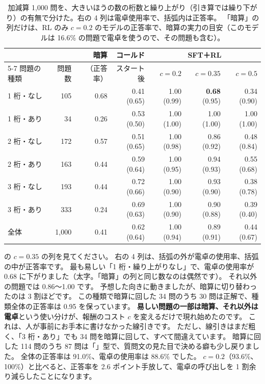 \begin{table}[tbp]
\centering
\caption{加減算 1,000 問を、大きいほうの数の桁数と繰り上がり（引き算では繰り下がり）の有無で分けた。右の 4 列は電卓使用率で、括弧内は正答率。
「暗算」の列だけは、RL のみ $c=0.2$ のモデルの正答率で、暗算の実力の目安（このモデルは 16.6\% の問題で電卓を使うので、その問題も含む）。}
\label{tab:arl-breakdown}
\small
\begin{tabular}{lrrrrrr}
\toprule
 & & 暗算 & コールド & \multicolumn{3}{c}{SFT＋RL} \\
\cmidrule(lr){5-7}
問題の種類 & 問題数 & （正答率） & スタート後 & $c=0.2$ & $c=0.35$ & $c=0.5$ \\
\midrule
1 桁・なし & 105 & 0.68 & 0.41 (0.65) & 1.00 (0.99) & \textbf{0.68} (0.95) & 0.34 (0.90) \\
1 桁・あり & 34 & 0.26 & 0.53 (0.50) & 1.00 (1.00) & 1.00 (1.00) & 1.00 (1.00) \\
2 桁・なし & 172 & 0.57 & 0.51 (0.65) & 1.00 (0.98) & 0.86 (0.92) & 0.48 (0.84) \\
2 桁・あり & 163 & 0.44 & 0.59 (0.64) & 1.00 (0.95) & 0.94 (0.93) & 0.55 (0.68) \\
3 桁・なし & 193 & 0.44 & 0.72 (0.66) & 1.00 (0.90) & 0.93 (0.90) & 0.38 (0.78) \\
3 桁・あり & 333 & 0.24 & 0.69 (0.63) & 1.00 (0.90) & 0.90 (0.88) & 0.39 (0.40) \\
\midrule
全体 & 1,000 & 0.41 & 0.62 (0.64) & 1.00 (0.94) & 0.89 (0.91) & 0.44 (0.67) \\
\bottomrule
\end{tabular}
\end{table}

の $c=0.35$ の列を見てください。
右の 4 列は、括弧の外が電卓の使用率、括弧の中が正答率です。
最も易しい「1 桁・繰り上がりなし」で、電卓の使用率が 0.68 に下がりました（太字。「暗算」の列と同じ数なのは偶然です）。
それ以外の問題では 0.86〜1.00 です。
予想した向きに動きましたが、暗算に切り替わったのは 3 割ほどです。
この種類で暗算に回した 34 問のうち 30 問は正解で、種類全体の正答率は 0.95 を保っています。
\textbf{易しい問題の一部は暗算、それ以外は電卓}という使い分けが、報酬のコスト $c$ を変えるだけで現れ始めたのです。
これは、人が事前にお手本に書けなかった線引きです。
ただし、線引きはまだ粗く、「3 桁・あり」でも 34 問を暗算に回して、すべて間違えています。
暗算に回した 114 問のうち 87 問は「」型で、質問文の見た目で決める癖も少し戻りました。
全体の正答率は 91.0\%、電卓の使用率は 88.6\% でした。
$c=0.2$（93.6\%、100\%）と比べると、正答率を 2.6 ポイント手放して、電卓の呼び出しを 1 割余り減らしたことになります。

